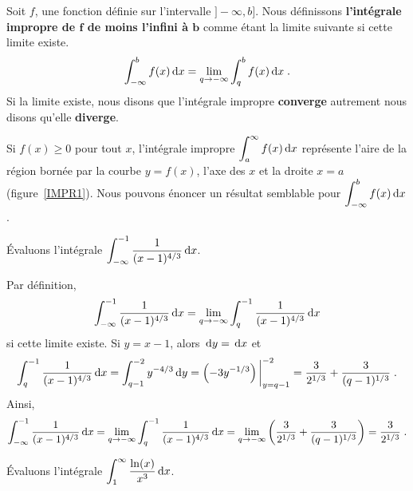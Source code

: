 {\begin{defn}
Soit $f$, une fonction définie sur l'intervalle $]-\infty, b]$. Nous
définissons {\bfseries l'intégrale impropre de $\mathbf f$ de moins
l'infini à $\mathbf b$} comme étant la limite suivante si cette limite
existe.
\[
\int_{-\infty}^b f(x) \,\mathrm{d}x = \lim_{q\rightarrow -\infty} \int_q^b f(x)\,\mathrm{d}x \; .
\]
Si la limite existe, nous disons que l'intégrale impropre
{\bfseries converge} autrement nous disons qu'elle {\bfseries diverge}.
\end{defn}

Si $f(x)\geq 0$ pour tout $x$, l'intégrale impropre
$\displaystyle \int_a^\infty f(x) \,\mathrm{d}x$ représente l'aire de la
région bornée par la courbe $y=f(x)$, l'axe des $x$ et la droite $x=a$
(figure~\ref{IMPR1}).  Nous pouvons énoncer un
résultat semblable pour $\displaystyle \int_{-\infty}^b f(x) \,\mathrm{d}x$.


\begin{egg}
Évaluons l'intégrale
$\displaystyle \int_{-\infty}^{-1} \frac{1}{(x-1)^{4/3}} \,\mathrm{d}x$.

Par définition,
\[
\int_{-\infty}^{-1} \frac{1}{(x-1)^{4/3}} \,\mathrm{d}x =
\lim_{q\rightarrow -\infty} \int_q^{-1} \frac{1}{(x-1)^{4/3}} \,\mathrm{d}x
\]
si cette limite existe.  Si $y=x-1$, alors $\,\mathrm{d}y = \,\mathrm{d}x$ et
\[
\int_q^{-1} \frac{1}{(x-1)^{4/3}} \,\mathrm{d}x = \int_{q-1}^{-2} y^{-4/3} \,\mathrm{d}y
= \left( -3 y^{-1/3} \right)\bigg|_{y=q-1}^{-2}
= \frac{3}{2^{1/3}} + \frac{3}{(q-1)^{1/3}} \; .
\]
Ainsi,
\[
\int_{-\infty}^{-1} \frac{1}{(x-1)^{4/3}} \,\mathrm{d}x
=\lim_{q\rightarrow -\infty} \int_q^{-1} \frac{1}{(x-1)^{4/3}} \,\mathrm{d}x
=\lim_{q\rightarrow -\infty} \left(\frac{3}{2^{1/3}}
+ \frac{3}{(q-1)^{1/3}} \right)
= \frac{3}{2^{1/3}} \; .
\]
\end{egg}

\begin{egg}
Évaluons l'intégrale
$\displaystyle \int_1^\infty \frac{\ln(x)}{x^3} \,\mathrm{d}x$.


\end{egg}}
